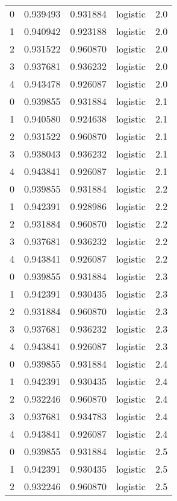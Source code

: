 \begin{tabular}{rrrlr}
     0 & 0.939493 & 0.931884 & logistic &        2.0 \\
     1 & 0.940942 & 0.923188 & logistic &        2.0 \\
     2 & 0.931522 & 0.960870 & logistic &        2.0 \\
     3 & 0.937681 & 0.936232 & logistic &        2.0 \\
     4 & 0.943478 & 0.926087 & logistic &        2.0 \\
     0 & 0.939855 & 0.931884 & logistic &        2.1 \\
     1 & 0.940580 & 0.924638 & logistic &        2.1 \\
     2 & 0.931522 & 0.960870 & logistic &        2.1 \\
     3 & 0.938043 & 0.936232 & logistic &        2.1 \\
     4 & 0.943841 & 0.926087 & logistic &        2.1 \\
     0 & 0.939855 & 0.931884 & logistic &        2.2 \\
     1 & 0.942391 & 0.928986 & logistic &        2.2 \\
     2 & 0.931884 & 0.960870 & logistic &        2.2 \\
     3 & 0.937681 & 0.936232 & logistic &        2.2 \\
     4 & 0.943841 & 0.926087 & logistic &        2.2 \\
     0 & 0.939855 & 0.931884 & logistic &        2.3 \\
     1 & 0.942391 & 0.930435 & logistic &        2.3 \\
     2 & 0.931884 & 0.960870 & logistic &        2.3 \\
     3 & 0.937681 & 0.936232 & logistic &        2.3 \\
     4 & 0.943841 & 0.926087 & logistic &        2.3 \\
     0 & 0.939855 & 0.931884 & logistic &        2.4 \\
     1 & 0.942391 & 0.930435 & logistic &        2.4 \\
     2 & 0.932246 & 0.960870 & logistic &        2.4 \\
     3 & 0.937681 & 0.934783 & logistic &        2.4 \\
     4 & 0.943841 & 0.926087 & logistic &        2.4 \\
     0 & 0.939855 & 0.931884 & logistic &        2.5 \\
     1 & 0.942391 & 0.930435 & logistic &        2.5 \\
     2 & 0.932246 & 0.960870 & logistic &        2.5 \\

\end{tabular}
